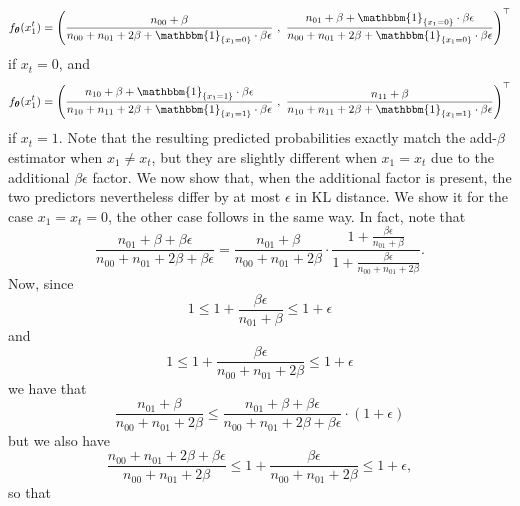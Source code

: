 \begin{equation}
f_{\btheta}(x_1^t) = \left(\frac{n_{00} + \beta}{n_{00} + n_{01} + 2\beta + \mathbbm{1}_{\{x_1 = 0\}}\cdot\beta\epsilon} \ , \ \frac{n_{01} + \beta + \mathbbm{1}_{\{x_1 = 0\}}\cdot\beta\epsilon}{n_{00} + n_{01} + 2\beta + \mathbbm{1}_{\{x_1 = 0\}}\cdot\beta\epsilon}\right)^\top
\end{equation}
if $x_t = 0$, and
\begin{equation}
f_{\btheta}(x_1^t) = \left(\frac{n_{10} + \beta + \mathbbm{1}_{\{x_1 = 1\}}\cdot\beta\epsilon}{n_{10} + n_{11} + 2\beta + \mathbbm{1}_{\{x_1 = 1\}}\cdot\beta\epsilon} \ , \ \frac{n_{11} + \beta}{n_{10} + n_{11} + 2\beta + \mathbbm{1}_{\{x_1 = 1\}}\cdot\beta\epsilon}\right)^\top
\end{equation}
if $x_t = 1$.
Note that the resulting predicted probabilities exactly match the add-$\beta$ estimator when $x_1 \neq x_t$, but they are slightly different when $x_1 = x_t$ due to the additional $\beta\epsilon$ factor. We now show that, when the additional factor is present, the two predictors nevertheless differ by at most $\epsilon$ in KL distance. We show it for the case $x_1 = x_t = 0$, the other case follows in the same way. In fact, note that
\begin{equation}
\frac{n_{01} + \beta + \beta\epsilon}{n_{00} + n_{01} + 2\beta + \beta\epsilon} = \frac{n_{01} + \beta}{n_{00} + n_{01} + 2\beta} \cdot\frac{1 + \frac{\beta\epsilon}{n_{01}+\beta}}{1 + \frac{\beta\epsilon}{n_{00}+n_{01}+2\beta}}.
\end{equation}
Now, since
\begin{equation}
1 \leq 1 + \frac{\beta\epsilon}{n_{01}+\beta} \leq 1+\epsilon
\end{equation}
and
\begin{equation}
1 \leq 1 + \frac{\beta\epsilon}{n_{00}+n_{01}+2\beta} \leq 1+\epsilon
\end{equation}
we have that
\begin{equation}
\frac{n_{01} + \beta}{n_{00} + n_{01} + 2\beta} \leq \frac{n_{01} + \beta + \beta\epsilon}{n_{00} + n_{01} + 2\beta + \beta\epsilon} \cdot \left(1+\epsilon\right)
\end{equation}
but we also have
\begin{equation}
\frac{n_{00} + n_{01} + 2\beta + \beta\epsilon}{n_{00} + n_{01} + 2\beta} \leq 1 + \frac{\beta\epsilon}{n_{00} + n_{01} + 2\beta} \leq 1 + \epsilon,
\end{equation}
so that
